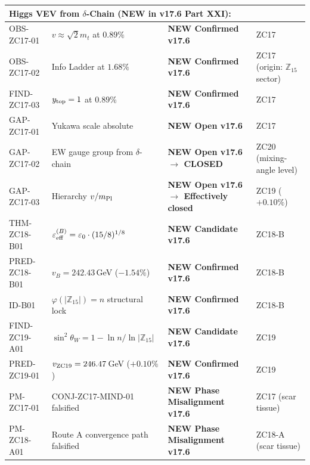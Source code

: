 \documentclass[12pt, a4paper]{article}
\begin{document}
\begin{keybox}[title={Master Z-Programme Status Table v17.6 (Canonical, Post-v17.6 Closures)}]
{\begin{longtable}{p{2.8cm} p{6.5cm} p{1.8cm} p{3.4cm}}
\midrule
\multicolumn{4}{l}{\textbf{Higgs VEV from $\delta$-Chain (NEW in v17.6 Part XXI):}} \\
\midrule
OBS-ZC17-01 & $v \approx \sqrt{2} m_t$ at $0.89\%$
   & \textbf{NEW Confirmed v17.6} & ZC17 \\
OBS-ZC17-02 & Info Ladder at $1.68\%$
   & \textbf{NEW Confirmed v17.6} & ZC17 (origin: $\mathbb{Z}_{15}$ sector) \\
FIND-ZC17-03 & $y_{\rm top} = 1$ at $0.89\%$
   & \textbf{NEW Confirmed v17.6} & ZC17 \\
GAP-ZC17-01 & Yukawa scale absolute
   & \textbf{NEW Open v17.6} & ZC17 \\
GAP-ZC17-02 & EW gauge group from $\delta$-chain
   & \textbf{NEW Open v17.6 $\to$ CLOSED} & ZC20 (mixing-angle level) \\
GAP-ZC17-03 & Hierarchy $v/m_{\rm Pl}$
   & \textbf{NEW Open v17.6 $\to$ Effectively closed} & ZC19 ($+0.10\%$) \\
THM-ZC18-B01 & $\varepsilon_{\rm eff}^{(B)} = \varepsilon_0 \cdot (15/8)^{1/8}$
   & \textbf{NEW Candidate v17.6} & ZC18-B \\
PRED-ZC18-B01 & $v_B = 242.43$\,GeV ($-1.54\%$)
   & \textbf{NEW Confirmed v17.6} & ZC18-B \\
ID-B01 & $\varphi(|\mathbb{Z}_{15}|) = n$ structural lock
   & \textbf{NEW Confirmed v17.6} & ZC18-B \\
FIND-ZC19-A01 & $\sin^2\theta_W = 1 - \ln n/\ln|\mathbb{Z}_{15}|$
   & \textbf{NEW Candidate v17.6} & ZC19 \\
PRED-ZC19-01 & $v_{\rm ZC19} = 246.47$\,GeV ($+0.10\%$)
   & \textbf{NEW Confirmed v17.6} & ZC19 \\
PM-ZC17-01 & CONJ-ZC17-MIND-01 falsified
   & \textbf{NEW Phase Misalignment v17.6} & ZC17 (scar tissue) \\
PM-ZC18-A01 & Route A convergence path falsified
   & \textbf{NEW Phase Misalignment v17.6} & ZC18-A (scar tissue) \\


\end{longtable}}
\end{keybox}
\end{document}
